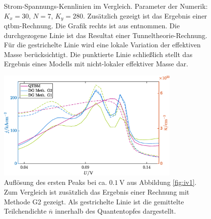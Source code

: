 \begin{figure}
\begin{subfigure}[b]{0.48\textwidth}
        \label{fig:frensley_iv}
    \end{subfigure}
    \caption[]
    {Strom-Spannungs-Kennlinien im Vergleich. Parameter der Numerik: $K_x=30$, $N=7$, $K_y=280$. Zusätzlich gezeigt ist das Ergebnis einer \ac{qtbm}-Rechnung. Die Grafik rechts ist aus \cite{frensley3} entnommen. Die durchgezogene Linie ist das Resultat einer Tunneltheorie-Rechnung. Für die gestrichelte Linie wird eine lokale Variation der effektiven Masse berücksichtigt. Die punktierte Linie schließlich stellt das Ergebnis eines Modells mit nicht-lokaler effektiver Masse dar.}
    \label{fig:iv_vergleich1}
\end{figure}

\begin{figure}
  \centering
  \includegraphics[width=0.8\textwidth]{plots/IV/IV_qtbm_dg_fein.eps}
  \caption{Auflösung des ersten Peaks bei ca. $\SI{0.1}{\volt}$ aus Abbildung \ref{fig:iv1}. Zum Vergleich ist zusätzlich das Ergebnis einer Rechnung mit Methode G2 gezeigt. Als gestrichelte Linie ist die gemittelte Teilchendichte $\overline{n}$ innerhalb des Quantentopfes dargestellt.}
  \label{fig:iv2}
\end{figure}

